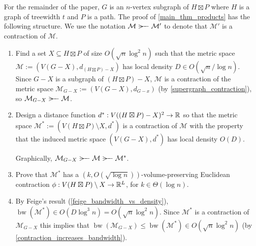 \documentclass{patmorin}
\renewcommand{\le}{\leqslant}
\DeclareMathOperator{\bw}{bw}
\begin{document}
For the remainder of the paper, $G$ is an $n$-vertex subgraph of $H\boxtimes P$ where $H$ is a graph of treewidth $t$ and $P$ is a path.  The proof of \cref{main_thm_products} has the following structure. We use the notation $\mathcal{M}\rightbroom\mathcal{M'}$ to denote that $\mathcal{M}'$ is a contraction of $\mathcal{M}$.

\begin{enumerate}
  \item Find a set $X\subseteq H\boxtimes P$ of size $O(\sqrt{n}\log^2 n)$ such that the metric space $\mathcal{M}:=(V(G-X),d_{(H\boxtimes P)-X})$ has local density $D\in O(\sqrt{n}/\log n)$.  Since $G-X$ is a subgraph of $(H\boxtimes P)-X$, $\mathcal{M}$ is a contraction of the metric space $\mathcal{M}_{G-X}:=(V(G-X),d_{G-x})$ (by \cref{supergraph_contraction}), so $\mathcal{M}_{G-X}\rightbroom\mathcal{M}$.

  \item Design a distance function $d^*:V((H\boxtimes P)-X)^2\to\mathbb{R}$ so that the metric space $\mathcal{M}^*:=(V(H\boxtimes P)\setminus X,d^*)$ is a contraction of $\mathcal{M}$ with the property that the induced metric space $(V(G-X),d^*)$ has local density $O(D)$.

  Graphically, $\mathcal{M}_{G-X}\rightbroom\mathcal{M}\rightbroom\mathcal{M}^*$.

  \item Prove that $\mathcal{M}^*$ has a $(k,O(\sqrt{\log n}))$-volume-preserving Euclidean contraction $\phi:V(H\boxtimes P)\setminus X\to\mathbb{R}^L$, for $k\in\Theta(\log n)$.


  \item
   By Feige's result (\cref{feige_bandwidth_vs_density}),  $\bw(\mathcal{M}^*)\in O(D\log^3 n)=O(\sqrt{n}\log^2 n)$.  Since $\mathcal{M}^*$ is a contraction of $\mathcal{M}_{G-X}$ this implies that $\bw(\mathcal{M}_{G-X}) \le \bw(\mathcal{M}^*)\in O(\sqrt{n}\log^2 n)$ (by \cref{contraction_increases_bandwidth}).
\end{enumerate}
\end{document}
